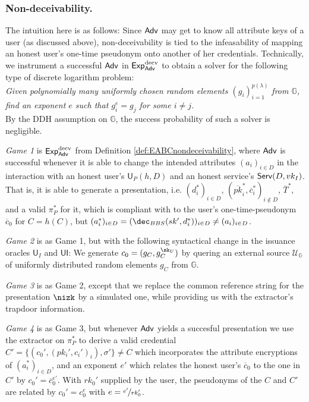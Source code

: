 \subsubsection{Non-deceivability.}
The intuition here is as follows:
Since $\mathsf{Adv}$ may get to know all attribute keys of a user (as discussed above), non-deceivability is tied to the infeasability of mapping an honest user's one-time pseudonym onto another of her credentials.
Technically, we instrument a successful $\mathsf{Adv}$ in $\operatorname{\mathsf{Exp}_{\mathsf{Adv}}^{decv}}$ to obtain a solver for the following type of discrete logarithm problem:
\\
\emph{
Given polynomially many uniformly chosen random elements $(g_i)_{i=1}^{p(\lambda)}$ from $\mathbb G$, find an exponent $e$ such that $g_{i}^{e}= g_j$ for some $i\neq j$.
}
\\
By the DDH assumption on $\mathbb G$, the success probability of such a solver is negligible.

\begin{description}
\item
\emph{Game 1} is $\operatorname{\mathsf{Exp}_{\mathsf{Adv}}^{decv}}$ from Definition \ref{def:EABCnondeceivability}, where $\mathsf{Adv}$ is successful whenever it is able to  change the intended attributes $(a_i)_{i\in D}$ in the interaction with an honest user's $\mathsf{U}_P(h, D)$ and an honest service's $\operatorname{\mathsf{Serv}}(D,vk_I)$.
That is, it is able to generate a presentation, i.e. $\left(d_i^* \right)_{i\in D}$,  $\left( \overline{pk}^*_i, \overline c_i^*\right)_{i \notin D}$, $\overline T^*$, and a valid $\pi_P^*$ for it, which is compliant with to the user's one-time-pseudonym $\overline c_0$ for $C=h(C)$,  but $(a_i^*)_{i\in D} = (\dec_{BBS}(sk', d_i^*))_{i\in D}\neq (a_i)_{i\in D}$.

\item
\emph{Game 2} is as Game 1, but with the following syntactical change in the issuance oracles $\mathsf{U}_I$ and $\mathsf{UI}$: 
We generate $c_0=(g_C,g_C^{\sk_U})$  by quering an external source $\mathcal U_{\mathbb G}$ of uniformly distributed random elements $g_C$ from $\mathbb G$. 
 
\item
\emph{Game 3} is as Game 2, except that we replace the common reference string for the presentation $\nizk$ by a simulated one, while providing us with the extractor's trapdoor information. 
 
\item
\emph{Game 4} is as Game 3, but whenever $\mathsf{Adv}$ yields a succesful presentation we use the extractor on $\pi_P^*$ to derive a valid credential $C'=\{(c_0', (pk_i',c_i')_{i}),\sigma'\} \neq C$ 
which incorporates the attribute encryptions of $(a_i^*)_{i\in D}$, and an exponent $e'$ which relates the honest user's $\overline c_0$ to the one in $C'$ by $c_0' = \overline c_0^{e'}$.
With  $rk_0'$ supplied by the user, the pseudonyms of the $C$ and $C'$ are related by
$c_0' = c_0^{e}$ with $e= \nicefrac{e'}{rk_0'}$.
\end{description}


